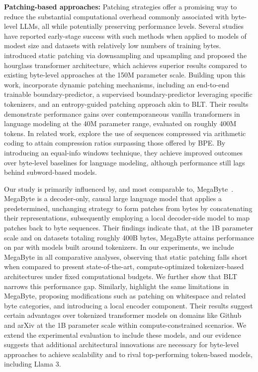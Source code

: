 \textbf{Patching-based approaches:} Patching strategies offer a promising way to reduce the substantial computational overhead commonly associated with byte-level LLMs, all while potentially preserving performance levels. Several studies have reported early-stage success with such methods when applied to models of modest size and datasets with relatively low numbers of training bytes. \cite{nawrot-etal-2022-hierarchical} introduced static patching via downsampling and upsampling and proposed the hourglass transformer architecture, which achieves superior results compared to existing byte-level approaches at the 150M parameter scale. Building upon this work, \cite{nawrot-etal-2023-efficient} incorporate dynamic patching mechanisms, including an end-to-end trainable boundary-predictor, a supervised boundary-predictor leveraging specific tokenizers, and an entropy-guided patching approach akin to {\textsc BLT}. Their results demonstrate performance gains over contemporaneous vanilla transformers in language modeling at the 40M parameter range, evaluated on roughly 400M tokens. In related work, \cite{lester2024training} explore the use of sequences compressed via arithmetic coding to attain compression ratios surpassing those offered by BPE. By introducing an equal-info windows technique, they achieve improved outcomes over byte-level baselines for language modeling, although performance still lags behind subword-based models.

Our study is primarily influenced by, and most comparable to, MegaByte~\citep{yu2023megabyte}. MegaByte is a decoder-only, causal large language model that applies a predetermined, unchanging strategy to form patches from bytes by concatenating their representations, subsequently employing a local decoder-side model to map patches back to byte sequences. Their findings indicate that, at the 1B parameter scale and on datasets totaling roughly 400B bytes, MegaByte attains performance on par with models built around tokenizers. In our experiments, we include MegaByte in all comparative analyses, observing that static patching falls short when compared to present state-of-the-art, compute-optimized tokenizer-based architectures under fixed computational budgets. We further show that {\textsc BLT} narrows this performance gap. Similarly, \cite{slagle2024spacebyte} highlight the same limitations in MegaByte, proposing modifications such as patching on whitespace and related byte categories, and introducing a local encoder component. Their results suggest certain advantages over tokenized transformer models on domains like Github and arXiv at the 1B parameter scale within compute-constrained scenarios. We extend the experimental evaluation to include these models, and our evidence suggests that additional architectural innovations are necessary for byte-level approaches to achieve scalability and to rival top-performing token-based models, including Llama 3.

